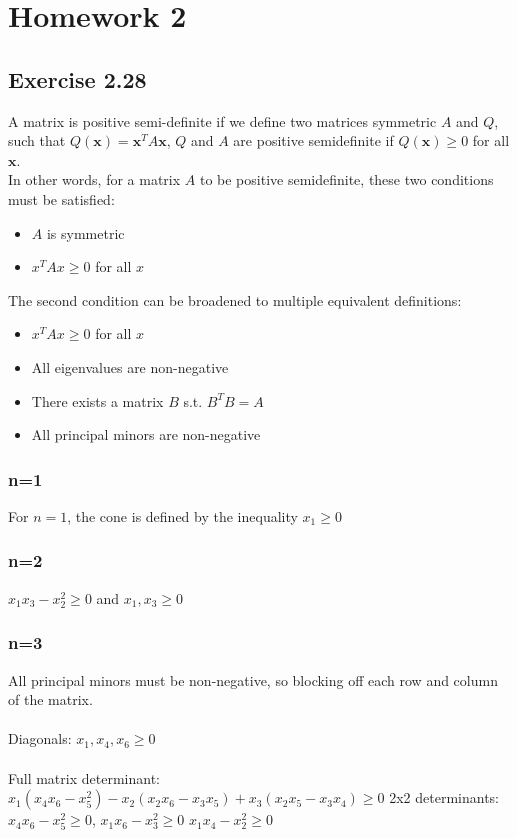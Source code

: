 \section{Homework 2}
\subsection{Exercise 2.28}
A matrix is positive semi-definite if we define two matrices symmetric $A$ and $Q$, such that $Q(\textbf{x}) = \textbf{x}^T A \textbf{x} $, $Q$ and $A$ are positive semidefinite if $Q(\textbf{x}) \geq 0$ for all $\textbf{x}$.
\\
In other words, for a matrix $A$ to be positive semidefinite, these two conditions must be satisfied:
\begin{itemize}
  \item $A$ is symmetric
  \item $x^T A x \geq 0$ for all $x$
\end{itemize}
The second condition can be broadened to multiple equivalent definitions:
\begin{itemize}
  \item $x^T A x \geq 0$ for all $x$
  \item All eigenvalues are non-negative
  \item There exists a matrix $B$ s.t. $B^TB = A$
  \item All principal minors are non-negative
\end{itemize}
\subsubsection{n=1}
For $n = 1 $, the cone is defined by the inequality $x_1 \geq 0 $
\subsubsection{n=2}
$x_1x_3 - x_2^2 \geq 0 $ and $x_1,x_3 \geq 0$
\subsubsection{n=3}
All principal minors must be non-negative, so blocking off each row and column of the matrix.
\\ \\
Diagonals: $x_1,x_4,x_6 \geq 0$
\\ \\ 
Full matrix determinant: $x_1 (x_4 x_6 - x_5^2) - x_2 (x_2 x_6 - x_3 x_5) + x_3(x_2 x_5 - x_3 x_4) \geq 0$
2x2 determinants: $x_4 x_6 - x_5^2 \geq 0$, $ x_1 x_6 - x_3^2 \geq 0$ $ x_1 x_4 - x_2^2 \geq 0 $ 
